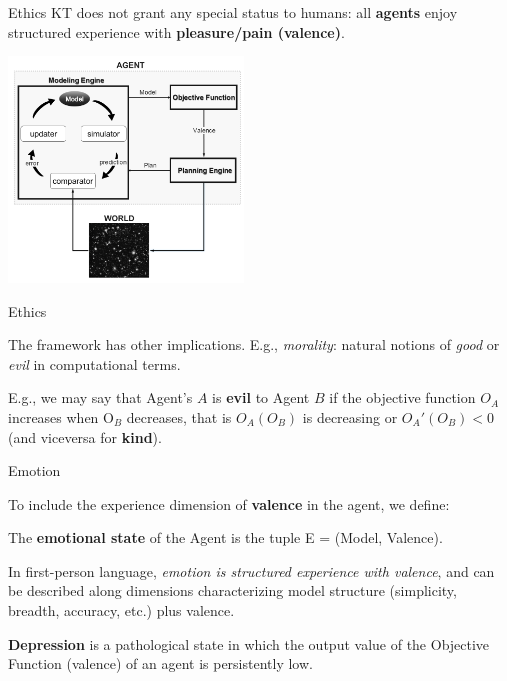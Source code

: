 \begin{frame}[label=ladila]{Ethics}
 KT does not grant any special status to humans:  all \textbf{agents} enjoy structured experience with  \textbf{pleasure/pain (valence)}. \vfill
 \begin{center}
  \includegraphics[height=6cm]{img/Figure1_StructuredDynamics.png}
  \end{center}

\end{frame}



\begin{frame}[label=ladila]{Ethics}


The framework has other implications. E.g.,  \textit{morality}:  natural notions of {\em good} or {\em evil} in computational terms. \vfill

E.g., we may say that Agent's $A$ is \textbf{evil} to Agent $B$ if the objective function   $O_A$ increases when O$_B$ decreases, that is $O_A(O_B)$ is decreasing or  $O_A'(O_B) <0$ (and viceversa for \textbf{kind}).
 \vfill
 

 
\end{frame}


\begin{frame}[label=ladila]{Emotion \cite{ruffini_algorithmic_2024}}
 
   To include the experience dimension of \textbf{valence} in the agent, we define: 
\begin{definition} 
The {\bf emotional state} of the Agent is the tuple E = (Model, Valence). 
\end{definition}
In first-person language, {\em emotion is structured experience with valence}, and can be described along dimensions characterizing model structure (simplicity, breadth, accuracy, etc.) plus valence.  
  \begin{definition} 
{\bf Depression} is a pathological state in which the output value of the Objective Function (valence) of an agent is persistently low.
\end{definition}
    
 
\end{frame}


